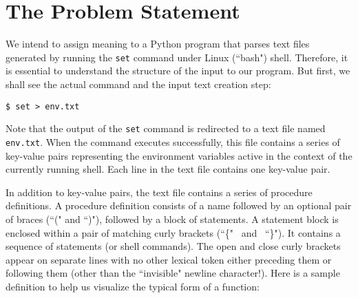 \documentclass[10pt, a4paper]{article}
\begin{document}

\section{The Problem Statement}
We intend to assign meaning to a Python program that parses text files generated by running the \texttt{set} command under Linux (``bash") shell. Therefore, it is essential to understand the structure of the input to our program. But first, we shall see the actual command and the input text creation step:
{
\begin{lstlisting}
$ set > env.txt
\end{lstlisting}}

\noindent Note that the output of the \texttt{set} command is redirected to a text file named \texttt{env.txt}. When the command executes successfully, this file contains a series of key-value pairs representing the environment variables active in the context of the currently running shell. Each line in the text file contains one key-value pair. 

In addition to key-value pairs, the text file contains a series of procedure definitions. A procedure definition consists of a name followed by an optional pair of braces (``(" and ``)"), followed by a block of statements. A statement block is enclosed within a pair of matching curly brackets (``\{" \ and \ ``\}"). It contains a sequence of statements (or shell commands). The open and close curly brackets appear on separate lines with no other lexical token either preceding them or following them (other than the ``invisible" newline character!). Here is a sample definition to help us visualize the typical form of a function:
\end{document}
